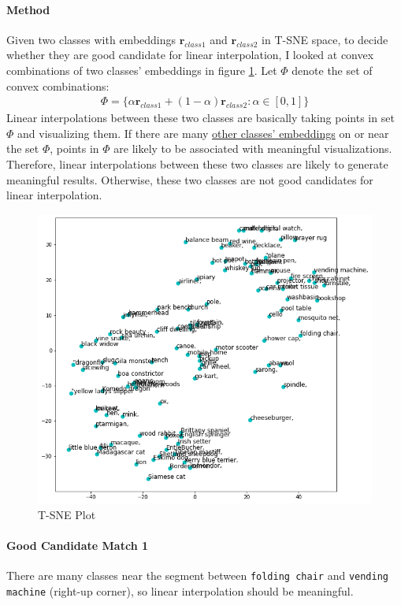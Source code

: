 \documentclass{article}
\begin{document}
	\paragraph{Method} Given two classes with embeddings $\mathbf{r}_{class1}$ and $\mathbf{r}_{class2}$ in T-SNE space, to decide whether they are good candidate for linear interpolation, I looked at convex combinations of two classes' embeddings in figure \ref{tsne}.
	Let $\Phi$ denote the set of convex combinations:
	\begin{align}
		\Phi = \{\alpha \mathbf{r}_{c l a s s 1}+(1-\alpha) \mathbf{r}_{c l a s s 2}: \alpha \in[0,1]\}
	\end{align}
	Linear interpolations between these two classes are basically taking points in set $\Phi$ and visualizing them.
	If there are many \ul{other classes' embeddings} on or near the set $\Phi$, points in $\Phi$ are likely to be associated with meaningful visualizations.
	Therefore, linear interpolations between these two classes are likely to generate meaningful results.
	Otherwise, these two classes are not good candidates for linear interpolation.
	\begin{figure}[H]
		\caption{T-SNE Plot}
		\centering
		\label{tsne}
		\medbreak
		\includegraphics[width=0.7\linewidth]{./tsne.png}
	\end{figure}
	\paragraph{Good Candidate Match 1} There are many classes near the segment between \texttt{folding chair} and \texttt{vending machine} (right-up corner), so linear interpolation should be meaningful.
	
\end{document}
